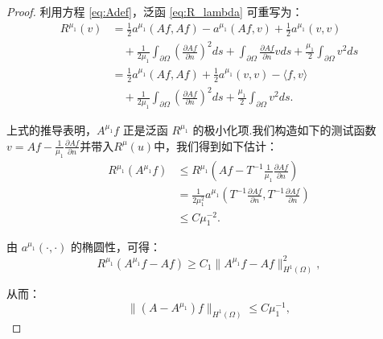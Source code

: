 \begin{proof}
利用方程 \eqref{eq:Adef}，泛函 \eqref{eq:R_lambda} 可重写为：
\begin{equation*}
\begin{aligned}
R^{\mu_{1}}(v) &= \frac{1}{2}a^{\mu_{1}}( Af,Af) - a^{\mu_{1}}( Af,v) +\frac{1}{2}a^{\mu_{1}}( v,v ) \\
&\quad +\frac{1}{2\mu_{1}}\int_{\partial\Omega}\left(\frac{\partial Af}{\partial n}\right)^{2}ds +\int_{\partial\Omega}\frac{\partial Af}{\partial n}vds+\frac{\mu_{1}}{2}\int_{\partial\Omega}v^{2}ds \\
&= \frac{1}{2}a^{\mu_{1}}( Af,Af)+\frac{1}{2}a^{\mu_{1}}( v,v )-\langle f,v\rangle \\
&\quad +\frac{1}{2\mu_{1}}\int_{\partial\Omega}\left(\frac{\partial Af}{\partial n}\right)^{2}ds +\frac{\mu_{1}}{2}\int_{\partial\Omega}v^{2}ds.
\end{aligned}
\end{equation*}

上式的推导表明，$A^{\mu_{1}}f$ 正是泛函 $R^{\mu_{1}}$ 的极小化项.我们构造如下的测试函数$v = Af - \frac{1}{\mu_1}\frac{\partial Af}{\partial n}$并带入$R^{\mu}(u)$中，我们得到如下估计：
\begin{equation*}
\begin{aligned}
R^{\mu_{1}}(A^{\mu_{1}}f) &\leq R^{\mu_{1}}\left(Af-T^{-1}\frac{1}{\mu_{1}}\frac{\partial Af}{\partial n}\right)\\
&= \frac{1}{2\mu_{1}^{2}}a^{\mu_{1}}\left(T^{-1}\frac{\partial Af}{\partial n}, T^{-1}\frac{\partial Af}{\partial n}\right) \\
&\leq C\mu_{1}^{-2}.
\end{aligned}
\end{equation*}

由 $a^{\mu_{1}}(\cdot,\cdot)$ 的椭圆性，可得：
\begin{equation*}
R^{\mu_{1}}(A^{\mu_{1}}f-Af)\geq C_1\|A^{\mu_{1}}f-Af\|_{H^{1}(\Omega)}^{2},
\end{equation*}

从而：
\begin{equation*}
\|(A-A^{\mu_{1}})f\|_{H^{1}(\Omega)}\leq C\mu_{1}^{-1},
\end{equation*}


\end{proof}
